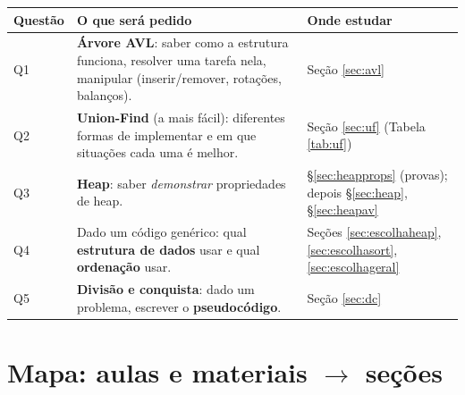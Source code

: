 \documentclass[11pt,a4paper]{article}
\theoremstyle{plain}
\theoremstyle{definition}
\theoremstyle{remark}
\numberwithin{equation}{section}
\begin{document}
\begin{prova}
\begin{center}
\begin{tabularx}{\linewidth}{@{}lXl@{}}
\toprule
\textbf{Questão} & \textbf{O que será pedido} & \textbf{Onde estudar} \\
\midrule
Q1 & \textbf{Árvore AVL}: saber como a estrutura funciona, resolver uma tarefa nela, manipular (inserir/remover, rotações, balanços). & Seção \ref{sec:avl} \\
Q2 & \textbf{Union-Find} (a mais fácil): diferentes formas de implementar e em que situações cada uma é melhor. & Seção \ref{sec:uf} (Tabela \ref{tab:uf}) \\
Q3 & \textbf{Heap}: saber \emph{demonstrar} propriedades de heap. & §\ref{sec:heapprops} (provas); depois §\ref{sec:heap}, §\ref{sec:heapav} \\
Q4 & Dado um código genérico: qual \textbf{estrutura de dados} usar e qual \textbf{ordenação} usar. & Seções \ref{sec:escolhaheap}, \ref{sec:escolhasort}, \ref{sec:escolhageral} \\
Q5 & \textbf{Divisão e conquista}: dado um problema, escrever o \textbf{pseudocódigo}. & Seção \ref{sec:dc} \\
\bottomrule
\end{tabularx}
\end{center}
\end{prova}

\tableofcontents
\newpage

\section*{Mapa: aulas e materiais $\to$ seções}
\end{document}

